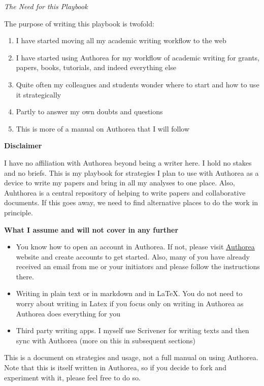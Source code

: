 \textit{The Need for this Playbook} 

The purpose of writing this playbook is twofold: 

\begin{enumerate}
\item I have started moving all my academic writing workflow to the web
\item I have started using Authorea for my workflow of academic writing for grants, papers, books, tutorials, and indeed everything else
\item Quite often my colleagues and students wonder where to start and how to use it strategically
\item Partly to answer my own doubts and questions
\item This is more of a manual on Authorea that I will follow
\end{enumerate}

\textbf{Disclaimer}

I have no affiliation with Authorea beyond being a writer here. I hold no stakes and no briefs. This is my playbook for strategies I plan to use with Authorea as a device to write my papers and bring in all my analyses to one place. Also, Auhthorea is a central repository of helping to write papers and collaborative documents. If this goes away, we need to find alternative places to do the work in principle. 

\textbf{What I assume and will not cover in any further}

\begin{itemize}
\item You know how to open an account in Authorea. If not, please visit \href{http://www.authorea.com}{Authorea} website and create accounts to get started. Also, many of you have already received an email from me or your initiators and please follow the instructions there.
\item Writing in plain text or in markdown and in LaTeX. You do not need to worry about writing in Latex if you focus only on writing in Authorea as Authorea does everything for you
\item Third party writing apps. I myself use Scrivener for writing texts and then sync with Authorea (more on this in subsequent sections)
\end{itemize}

This is a document on strategies and usage, not a full manual on using Authorea. Note that this is itself written in Authorea, so if you decide to fork and experiment with it, please feel free to do so.
    